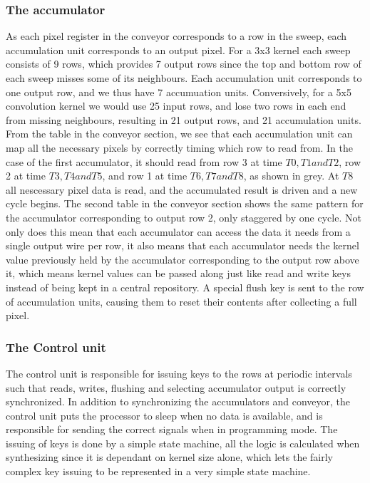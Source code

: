 \subsubsection{The accumulator}
As each pixel register in the conveyor corresponds to a row in the sweep, each accumulation unit corresponds to an output pixel.
For a 3x3 kernel each sweep consists of 9 rows, which provides 7 output rows since the top and bottom row of each sweep misses some of its neighbours.
Each accumulation unit corresponds to one output row, and we thus have 7 accumuation units.
Conversively, for a 5x5 convolution kernel we would use 25 input rows, and lose two rows in each end from missing neighbours, resulting in 21 output rows, and 21 accumulation units.
From the table in the conveyor section, we see that each accumulation unit can map all the necessary pixels by correctly timing which row to read from.
In the case of the first accumulator, it should read from row 3 at time $T0, T1 and T2$, row 2 at time $T3, T4 and T5$, and row 1 at time $T6, T7 and T8$, as shown in grey.
At $T8$ all nescessary pixel data is read, and the accumulated result is driven and a new cycle begins.
The second table in the conveyor section shows the same pattern for the accumulator corresponding to output row 2, only staggered by one cycle.
Not only does this mean that each accumulator can access the data it needs from a single output wire per row, it also means that each accumulator needs the kernel value previously held by the
accumulator corresponding to the output row above it, which means kernel values can be passed along just like read and write keys instead of being kept in a central repository.
A special flush key is sent to the row of accumulation units, causing them to reset their contents after collecting a full pixel.

\subsubsection{The Control unit}
The control unit is responsible for issuing keys to the rows at periodic intervals such that reads, writes, flushing and selecting accumulator output is correctly synchronized.
In addition to synchronizing the accumulators and conveyor, the control unit puts the processor to sleep when no data is available, and is responsible for sending the correct signals when in programming mode.
The issuing of keys is done by a simple state machine, all the logic is calculated when synthesizing since it is dependant on kernel size alone, which lets the fairly complex key issuing to be represented in a very simple state machine.

